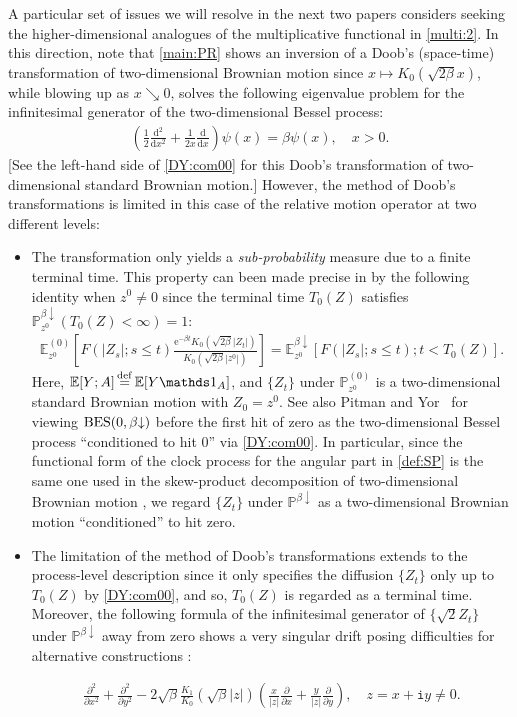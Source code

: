 \documentclass[12pt, twoside]{article}
\numberwithin{figure}{section}
\newcommand{\BES}{{\rm BES}}
\newcommand{\e}{{\mathrm e}}
\newcommand{\1}{\mathds 1}
\newcommand{\da}{{\downarrow}}
\renewcommand{\P}{{\mathbb P}}
\newcommand{\E}{{\mathbb E}}
\renewcommand{\d}{{\mathrm d}}
\newcommand{\2}{{\mathbf 1}}
\renewcommand{\i}{{\mathtt i}}
\newcommand{\defeq}{{\stackrel{\rm def}{=}}}
\newcommand{\two}{{\sqrt{2}}}
\begin{document}
A particular set of issues we will resolve in the next two papers \cite{C:SDBG2, C:SDBG3} considers seeking the higher-dimensional analogues of the multiplicative functional in \eqref{multi:2}. In this direction, note that \eqref{main:PR} shows an inversion of a Doob's (space-time) transformation of two-dimensional Brownian motion since $x\mapsto K_0(\sqrt{2\beta} x)$, while blowing up as $x\searrow 0$,
 solves the following eigenvalue problem for the infinitesimal generator of the two-dimensional Bessel process: 
\begin{align}\label{DE:K}
\left(\frac{1}{2}\frac{\d^2}{\d x^2}+\frac{1}{2x}\frac{\d}{\d x}\right)\psi(x)=\beta \psi(x),\quad x>0.
\end{align}
[See the left-hand side of \eqref{DY:com00} for this Doob's transformation of two-dimensional standard Brownian motion.]
However, the method of Doob's transformations is limited in this case of the relative motion operator at two different levels:
\begin{itemize}
\item The transformation only yields a \emph{sub-probability} measure due to a finite terminal time. This property can been made precise in \cite[(2.4)]{DY:Krein} by the following identity
when $z^0\neq 0 $ since the terminal time $T_0(Z)$ satisfies
 $\P^{\beta\da}_{z^0}(T_0(Z)<\infty)=1$: 
\begin{align}\label{DY:com00}
\E^{(0)}_{z^0}\left[F(|Z_s|;s\leq t)\frac{\e^{-\beta t}K_0(\sqrt{2\beta}|Z_t|)}{K_0(\sqrt{2\beta}|z^0|)}\right]=\E^{\beta\da}_{z^0}[F(|Z_s|;s\leq t);t<T_0(Z)].
\end{align}
Here, $\E[Y;A]\,\defeq\,\E[Y\1_A]$, and $\{Z_t\}$ under $\P^{(0)}_{z^0}$ is a two-dimensional standard Brownian motion with $Z_0=z^0$. 
See also Pitman and Yor~\cite[Section~4]{PY:BESINF} for viewing $\BES(0,\beta\da)$ before the first hit of zero
as the two-dimensional Bessel process ``conditioned to hit $0$'' via \eqref{DY:com00}. In particular, since the functional form of the clock process for the angular part in \eqref{def:SP} is the same one used in the skew-product decomposition of two-dimensional Brownian motion \cite[(2.11) Theorem, p.193]{RY}, 
we regard $\{Z_t\}$ under $\P^{\beta\da}$ as a two-dimensional Brownian motion ``conditioned'' to hit zero.
\item The limitation of the method of Doob's transformations extends to the process-level description since it only specifies the diffusion $\{Z_t\}$ only up to $T_0(Z)$ by \eqref{DY:com00}, and so, $T_0(Z)$ is regarded as a terminal time. Moreover,
the following formula of the infinitesimal generator of $\{ \two Z_t\}$ under $\P^{\beta\da}$ away from zero shows a very singular drift posing difficulties for alternative constructions \cite[Section~2.5]{C:BES}:
\begin{linenomath*}\begin{align}\label{def:gen}
\frac{\partial^2 }{\partial x^2}+\frac{\partial^2}{\partial y^2} -2\sqrt{\beta}\frac{K_1}{K_0}(\sqrt{\beta}\lvert z\rvert)\left(\frac{x}{\lvert z\rvert}\frac{\partial }{\partial x}+\frac{y}{\lvert z\rvert}\frac{\partial }{\partial y}\right),\quad z=x+\i y\neq 0.
\end{align}\end{linenomath*}
\end{itemize}
\end{document}
